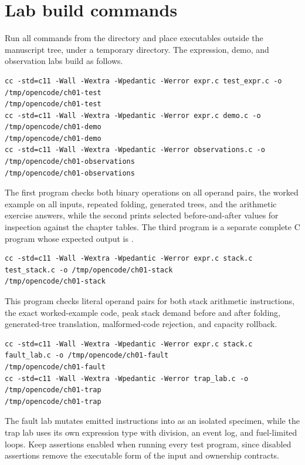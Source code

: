 \section{Lab build commands}
\label{sec:app-b-lab-commands}

Run all commands from the  directory and place executables outside the manuscript tree, under a temporary directory.
The expression, demo, and observation labs build as follows.
\begin{lstlisting}[caption={Build and run the expression, demo, and observation labs.},label={lst:app-b-basic-labs}]
cc -std=c11 -Wall -Wextra -Wpedantic -Werror expr.c test_expr.c -o /tmp/opencode/ch01-test
/tmp/opencode/ch01-test
cc -std=c11 -Wall -Wextra -Wpedantic -Werror expr.c demo.c -o /tmp/opencode/ch01-demo
/tmp/opencode/ch01-demo
cc -std=c11 -Wall -Wextra -Wpedantic -Werror observations.c -o /tmp/opencode/ch01-observations
/tmp/opencode/ch01-observations
\end{lstlisting}
The first program checks both binary operations on all operand pairs, the worked example on all inputs, repeated folding, generated trees, and the arithmetic exercise answers, while the second prints selected before-and-after values for inspection against the chapter tables.
The third program is a separate complete C program whose expected output is .
\begin{lstlisting}[caption={Build and run the stack-code lab.},label={lst:app-b-stack-lab}]
cc -std=c11 -Wall -Wextra -Wpedantic -Werror expr.c stack.c test_stack.c -o /tmp/opencode/ch01-stack
/tmp/opencode/ch01-stack
\end{lstlisting}
This program checks literal operand pairs for both stack arithmetic instructions, the exact worked-example code, peak stack demand before and after folding, generated-tree translation, malformed-code rejection, and capacity rollback.
\begin{lstlisting}[caption={Build and run the fault and trap laboratories.},label={lst:app-b-fault-trap-labs}]
cc -std=c11 -Wall -Wextra -Wpedantic -Werror expr.c stack.c fault_lab.c -o /tmp/opencode/ch01-fault
/tmp/opencode/ch01-fault
cc -std=c11 -Wall -Wextra -Wpedantic -Werror trap_lab.c -o /tmp/opencode/ch01-trap
/tmp/opencode/ch01-trap
\end{lstlisting}
The fault lab mutates emitted  instructions into  as an isolated specimen, while the trap lab uses its own expression type with division, an event log, and fuel-limited loops.
Keep assertions enabled when running every test program, since disabled assertions remove the executable form of the input and ownership contracts.

